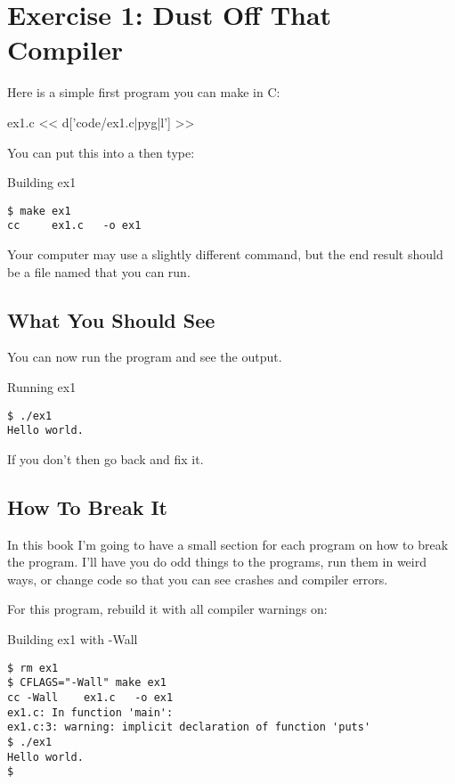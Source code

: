 \chapter{Exercise 1: Dust Off That Compiler}

Here is a simple first program you can make in C:

\begin{code}{ex1.c}
<< d['code/ex1.c|pyg|l'] >>
\end{code}

You can put this into a  then type:

\begin{Terminal}{Building ex1}
\begin{lstlisting}
$ make ex1
cc     ex1.c   -o ex1
\end{lstlisting}
\end{Terminal}

Your computer may use a slightly different command, but the end result should be
a file named  that you can run.

\section{What You Should See}

You can now run the program and see the output.

\begin{Terminal}{Running ex1}
\begin{lstlisting}
$ ./ex1
Hello world.
\end{lstlisting}
\end{Terminal}

If you don't then go back and fix it.

\section{How To Break It}

In this book I'm going to have a small section for each program on how to
break the program.  I'll have you do odd things to the programs, run them
in weird ways, or change code so that you can see crashes and compiler errors.

For this program, rebuild it with all compiler warnings on:

\begin{Terminal}{Building ex1 with -Wall}
\begin{lstlisting}
$ rm ex1
$ CFLAGS="-Wall" make ex1
cc -Wall    ex1.c   -o ex1
ex1.c: In function 'main':
ex1.c:3: warning: implicit declaration of function 'puts'
$ ./ex1
Hello world.
$ 
\end{lstlisting}
\end{Terminal}

